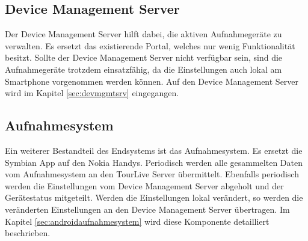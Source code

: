\subsection{Device Management Server}
Der Device Management Server hilft dabei, die aktiven Aufnahmegeräte zu verwalten. Es ersetzt das existierende Portal, welches nur wenig Funktionalität besitzt. Sollte der Device Management Server nicht verfügbar sein, sind die Aufnahmegeräte trotzdem einsatzfähig, da die Einstellungen auch lokal am Smartphone vorgenommen werden können. Auf den Device Management Server wird im Kapitel \ref{sec:devmgmtsrv} eingegangen.

\subsection{Aufnahmesystem}
Ein weiterer Bestandteil des Endsystems ist das Aufnahmesystem. Es ersetzt die Symbian App auf den Nokia Handys. Periodisch werden alle gesammelten Daten vom Aufnahmesystem an den TourLive Server übermittelt. Ebenfalls periodisch werden die Einstellungen vom Device Management Server abgeholt und der Gerätestatus mitgeteilt. Werden die Einstellungen lokal verändert, so werden die veränderten Einstellungen an den Device Management Server übertragen. Im Kapitel \ref{sec:androidaufnahmesystem} wird diese Komponente detailliert beschrieben.